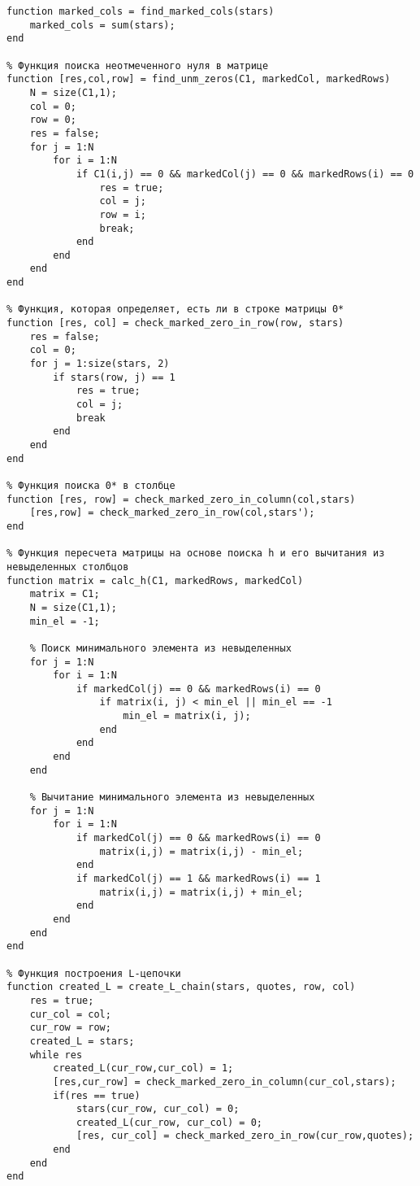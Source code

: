 \documentclass[a4paper,14pt]{article}
\begin{document}
\begin{lstlisting}[label=some-code,caption=Листинг программы]
% Функция поиска отмеченных столбцов
function marked_cols = find_marked_cols(stars)
    marked_cols = sum(stars);
end

% Функция поиска неотмеченного нуля в матрице
function [res,col,row] = find_unm_zeros(C1, markedCol, markedRows)
    N = size(C1,1);
    col = 0;
    row = 0;
    res = false;
    for j = 1:N
        for i = 1:N
            if C1(i,j) == 0 && markedCol(j) == 0 && markedRows(i) == 0
                res = true;
                col = j;
                row = i;
                break;
            end
        end
    end
end

% Функция, которая определяет, есть ли в строке матрицы 0*
function [res, col] = check_marked_zero_in_row(row, stars)
    res = false;
    col = 0;
    for j = 1:size(stars, 2)
        if stars(row, j) == 1
            res = true;
            col = j;
            break
        end
    end
end

% Функция поиска 0* в столбце
function [res, row] = check_marked_zero_in_column(col,stars)
    [res,row] = check_marked_zero_in_row(col,stars');
end

% Функция пересчета матрицы на основе поиска h и его вычитания из невыделенных столбцов
function matrix = calc_h(C1, markedRows, markedCol)
    matrix = C1;
    N = size(C1,1);
    min_el = -1;
    
    % Поиск минимального элемента из невыделенных
    for j = 1:N
        for i = 1:N
            if markedCol(j) == 0 && markedRows(i) == 0
                if matrix(i, j) < min_el || min_el == -1
                    min_el = matrix(i, j);
                end
            end
        end
    end
    
    % Вычитание минимального элемента из невыделенных
    for j = 1:N
        for i = 1:N
            if markedCol(j) == 0 && markedRows(i) == 0
                matrix(i,j) = matrix(i,j) - min_el;
            end
            if markedCol(j) == 1 && markedRows(i) == 1
                matrix(i,j) = matrix(i,j) + min_el;
            end
        end
    end
end

% Функция построения L-цепочки
function created_L = create_L_chain(stars, quotes, row, col)
    res = true;
    cur_col = col;
    cur_row = row;
    created_L = stars;
    while res
        created_L(cur_row,cur_col) = 1;
        [res,cur_row] = check_marked_zero_in_column(cur_col,stars);
        if(res == true)
            stars(cur_row, cur_col) = 0;
            created_L(cur_row, cur_col) = 0;
            [res, cur_col] = check_marked_zero_in_row(cur_row,quotes);
        end
    end
end


\end{lstlisting}
\end{document}
